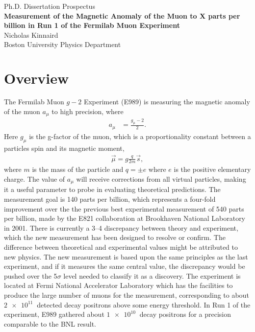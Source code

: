 \documentclass[12pt,letterpaper]{article}
\def\gmtwo{$g-2$\xspace}
\def\amu{$a_{\mu}$\xspace}
\begin{document}
\begin{center}
\Large{Ph.D. Dissertation Prospectus} \\\vspace{5mm}
\textbf{\Large{Measurement of the Magnetic Anomaly of the Muon to X parts per billion in Run 1 of the Fermilab Muon  Experiment}} \\\vspace{5mm}
\large{Nicholas Kinnaird} \\\vspace{5mm}
\large{Boston University Physics Department} \\\vspace{5mm}
\end{center}


\section*{Overview}


The Fermilab Muon \gmtwo Experiment (E989) is measuring the magnetic anomaly of the muon \amu to high precision, where  
		\begin{align}
            a_{\mu} &= \frac{g_{\mu}-2}{2}.
        \label{eq:anamoly}
		\end{align}
Here $g_{\mu}$ is the g-factor of the muon, which is a proportionality constant between a particles spin and its magnetic moment, 
		\begin{align}
            \vec{\mu} = g \frac{q}{2m} \vec{s},
        \label{eq:magneticmoment}
		\end{align}
where $m$ is the mass of the particle and $q = \pm e$ where $e$ is the positive elementary charge. The value of $a_{\mu}$ will receive corrections from all virtual particles, making it a useful parameter to probe in evaluating theoretical predictions. The measurement goal is 140 parts per billion, which represents a four-fold improvement over the the previous best experimental measurement of 540 parts per billion, made by the E821 collaboration at Brookhaven National Laboratory in 2001. There is currently a \SIrange{3}{4}{\sigma} discrepancy between theory and experiment, which the new measurement has been designed to resolve or confirm. The difference between theoretical and experimental values might be attributed to new physics. The new measurement is based upon the same principles as the last experiment, and if it measures the same central value, the discrepancy would be pushed over the 5$\sigma$ level needed to classify it as a discovery. The experiment is located at Fermi National Accelerator Laboratory which has the facilities to produce the large number of muons for the measurement, corresponding to about $\SI{2e11}{}$ detected decay positrons above some energy threshold. In Run 1 of the experiment, E989 gathered about $\SI{1e10}{}$ decay positrons for a precision comparable to the BNL result.
\end{document}
